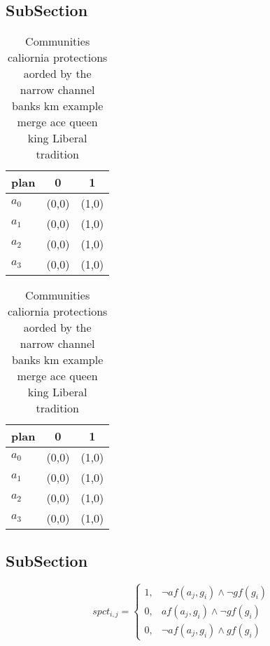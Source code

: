 \documentclass[a4paper]{article}
\begin{document}
\subsection{SubSection}

\begin{table}
\begin{adjustbox}{width=0.9\columnwidth}
\begin{tabular}{|l|l|l|}
\hline
\textbf{plan} & \multicolumn{1}{c|}{\textbf{0}} & \multicolumn{1}{c|}{\textbf{1}} \\ \hline
\textbf{$a_0$}  & (0,0) & (1,0) \\ \hline
\textbf{$a_1$}  & (0,0) & (1,0) \\ \hline
\textbf{$a_2$}  & (0,0) & (1,0) \\ \hline
\textbf{$a_3$}  & (0,0) & (1,0) \\ \hline
\end{tabular}
\end{adjustbox}
\caption{Communities caliornia protections aorded by the narrow channel banks km example merge ace queen king Liberal tradition 
}
\end{table}

\begin{table}
\begin{adjustbox}{width=0.9\columnwidth}
\begin{tabular}{|l|l|l|}
\hline
\textbf{plan} & \multicolumn{1}{c|}{\textbf{0}} & \multicolumn{1}{c|}{\textbf{1}} \\ \hline
\textbf{$a_0$}  & (0,0) & (1,0) \\ \hline
\textbf{$a_1$}  & (0,0) & (1,0) \\ \hline
\textbf{$a_2$}  & (0,0) & (1,0) \\ \hline
\textbf{$a_3$}  & (0,0) & (1,0) \\ \hline
\end{tabular}
\end{adjustbox}
\caption{Communities caliornia protections aorded by the narrow channel banks km example merge ace queen king Liberal tradition 
}
\end{table}

\subsection{SubSection}

\begin{equation}
spct_{i,j} =
\begin{cases}
1, & \text{$\neg af(a_j,g_i) \wedge \neg gf(g_i)$}\\
0, & \text{$af(a_j,g_i) \wedge \neg gf(g_i)$}\\
0, & \text{$\neg af(a_j,g_i) \wedge gf(g_i)$}
\end{cases}
\end{equation}
\end{document}

